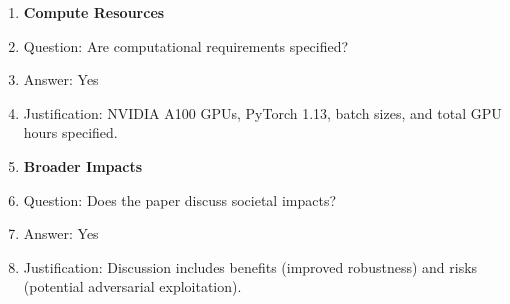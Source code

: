 \documentclass{article}
\begin{document}
\begin{enumerate}
\item {\bf Compute Resources}
    \item[] Question: Are computational requirements specified?
    \item[] Answer: Yes
    \item[] Justification: NVIDIA A100 GPUs, PyTorch 1.13, batch sizes, and total GPU hours specified.

\item {\bf Broader Impacts}
    \item[] Question: Does the paper discuss societal impacts?
    \item[] Answer: Yes
    \item[] Justification: Discussion includes benefits (improved robustness) and risks (potential adversarial exploitation).

\end{enumerate}
\end{document}
